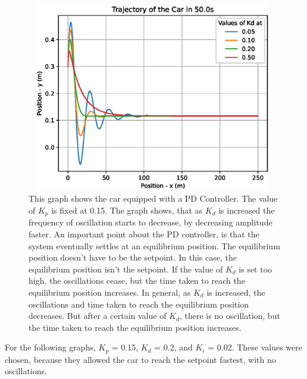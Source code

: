 \documentclass[10pt]{article}
\begin{document}
\begin{figure}[H]
\centering
\includegraphics[width=11cm, height=8.25cm]{q2_2_trajectory.eps}
\caption
{This graph shows the car equipped with a PD Controller. The value of $K_p$ is fixed at 0.15. The graph shows, that as $K_d$ is increased the frequency of oscillation starts to decrease, by decreasing amplitude faster. An important point about the PD controller, is that the system eventually settles at an equilibrium position. The equilibrium position doesn’t have to be the setpoint. In this case, the equilibrium position isn’t the setpoint. If the value of $K_d$ is set too high, the oscillations cease, but the time taken to reach the equilibrium position increases. In general, as $K_d$ is increased, the oscillations and time taken to reach the equilibrium position decreases. But after a certain value of $K_d$, there is no oscillation, but the time taken to reach the equilibrium position increases.}
\end{figure}

\newpage
For the following graphs, $K_p$ = 0.15, $K_d$ = 0.2, and $K_i$ = 0.02. These values were chosen, because they allowed the car to reach the setpoint fastest, with no oscillations.
\end{document}
